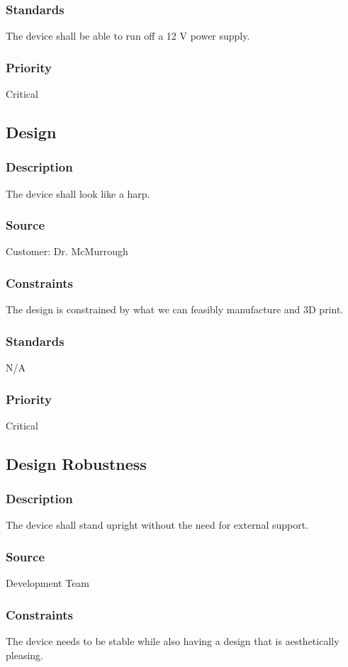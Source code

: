 \subsubsection{Standards}
The device shall be able to run off a 12 V power supply.
\subsubsection{Priority}
Critical

\subsection{Design}
\subsubsection{Description}
The device shall look like a harp.
\subsubsection{Source}
Customer: Dr. McMurrough
\subsubsection{Constraints}
The design is constrained by what we can feasibly manufacture and 3D print.
\subsubsection{Standards}
N/A
\subsubsection{Priority}
Critical

\subsection{Design Robustness}
\subsubsection{Description}
The device shall stand upright without the need for external support.
\subsubsection{Source}
Development Team
\subsubsection{Constraints}
The device needs to be stable while also having a design that is aesthetically pleasing.
